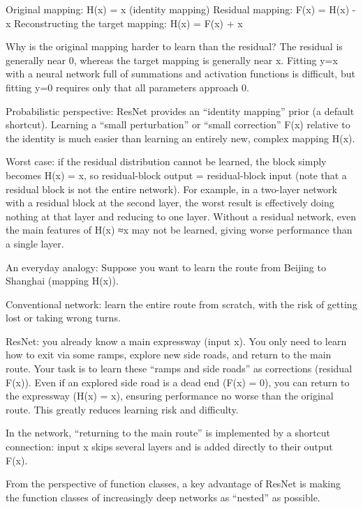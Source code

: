 Original mapping: H(x) = x (identity mapping)
Residual mapping: F(x) = H(x) - x
Reconstructing the target mapping: H(x) = F(x) + x

Why is the original mapping harder to learn than the residual? The residual is generally near 0, whereas the target mapping is generally near x. Fitting y=x with a neural network full of summations and activation functions is difficult, but fitting y=0 requires only that all parameters approach 0.

Probabilistic perspective: ResNet provides an ``identity mapping'' prior (a default shortcut). Learning a ``small perturbation'' or ``small correction'' F(x) relative to the identity is much easier than learning an entirely new, complex mapping H(x).

Worst case: if the residual distribution cannot be learned, the block simply becomes H(x) = x, so residual-block output = residual-block input (note that a residual block is not the entire network). For example, in a two-layer network with a residual block at the second layer, the worst result is effectively doing nothing at that layer and reducing to one layer. Without a residual network, even the main features of H(x) ≈x may not be learned, giving worse performance than a single layer.

An everyday analogy:
Suppose you want to learn the route from Beijing to Shanghai (mapping H(x)).

Conventional network: learn the entire route from scratch, with the risk of getting lost or taking wrong turns.

ResNet: you already know a main expressway (input x). You only need to learn how to exit via some ramps, explore new side roads, and return to the main route. Your task is to learn these ``ramps and side roads'' as corrections (residual F(x)). Even if an explored side road is a dead end (F(x) = 0), you can return to the expressway (H(x) = x), ensuring performance no worse than the original route. This greatly reduces learning risk and difficulty.

In the network, ``returning to the main route'' is implemented by a shortcut connection: input x skips several layers and is added directly to their output F(x).

From the perspective of function classes, a key advantage of ResNet is making the function classes of increasingly deep networks as ``nested'' as possible.

